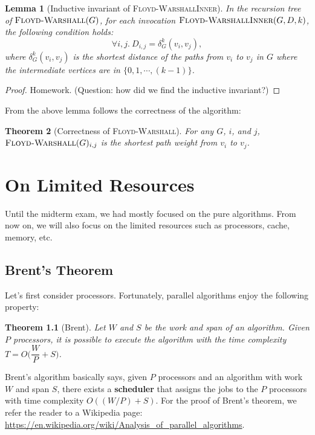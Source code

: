 \documentclass[11pt,a4paper,oneside,microtype,chapter,nokorean]{oblivoir}
\newtheorem{theorem}{Theorem}
\newtheorem{lemma}[theorem]{Lemma}
\begin{document}
\begin{lemma}[Inductive invariant of \textsc{Floyd-WarshallInner}] In the recursion tree of
  $\textsc{Floyd-Warshall}(G)$, for each invocation $\textsc{Floyd-WarshallInner}(G,D,k)$, the
  following condition holds:
  \[ \forall i,j.~D_{i,j} = \delta_G^k(v_i,v_j),
  \]
  where $\delta_G^k(v_i,v_j)$ is the shortest distance of the paths from $v_i$ to $v_j$ in $G$ where
  the intermediate vertices are in $\{0,1,\cdots,(k-1)\}$.
\end{lemma}
\begin{proof}
  Homework.  (Question: how did we find the inductive invariant?)
\end{proof}

From the above lemma follows the correctness of the algorithm:

\begin{theorem}[Correctness of \textsc{Floyd-Warshall}] For any $G$, $i$, and $j$,
  $\textsc{Floyd-Warshall}(G)_{i,j}$ is the shortest path weight from $v_i$ to $v_j$.
\end{theorem}




\chapter{On Limited Resources}

Until the midterm exam, we had mostly focused on the pure algorithms.  From now on, we will also
focus on the limited resources such as processors, cache, memory, etc.


\section{Brent's Theorem}

Let's first consider processors.  Fortunately, parallel algorithms enjoy the following property:

\begin{theorem}[Brent]
  Let $W$ and $S$ be the work and span of an algorithm.  Given $P$ processors, it is possible to
  execute the algorithm with the time complexity $T = O \Big( \dfrac{W}{P} + S \Big)$.
\end{theorem}

Brent's algorithm basically says, given $P$ processors and an algorithm with work $W$ and span $S$,
there exists a \textbf{scheduler} that assigns the jobs to the $P$ processors with time complexity
$O((W/P) + S)$.  For the proof of Brent's theorem, we refer the reader to a Wikipedia page:
\url{https://en.wikipedia.org/wiki/Analysis_of_parallel_algorithms}.
\end{document}
